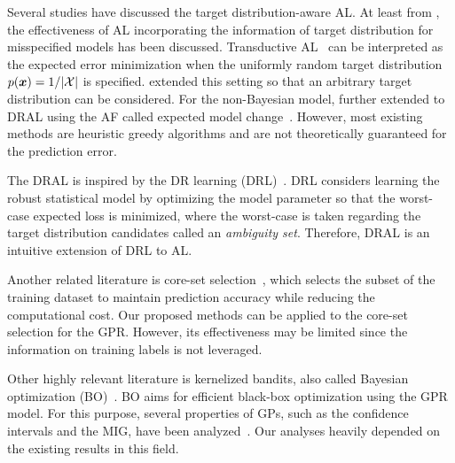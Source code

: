 Several studies have discussed the target distribution-aware AL.
%
At least from \citet{sugiyama2005active}, the effectiveness of AL incorporating the information of target distribution for misspecified models has been discussed.
%
Transductive AL~\citep{Seo2000gaussian,yu2006active,Shoham2023experimental} can be interpreted as the expected error minimization when the uniformly random target distribution $p(\boldsymbol{x}) = 1 / |{\cal X}|$ is specified.
%
\citet{kirsch2021test,kirsch2022unifying,bickford2023-prediction} extended this setting so that an arbitrary target distribution can be considered.
%
For the non-Bayesian model, \citet{frogner2021incorporating} further extended to DRAL using the AF called expected model change~\citep{settles2009-active}.
%
However, most existing methods are heuristic greedy algorithms and are not theoretically guaranteed for the prediction error.


The DRAL is inspired by the DR learning (DRL)~\citep{chen2018robust,chen2020distributionally}.
%
DRL considers learning the robust statistical model by optimizing the model parameter so that the worst-case expected loss is minimized, where the worst-case is taken regarding the target distribution candidates called an \emph{ambiguity set}.
%
Therefore, DRAL is an intuitive extension of DRL to AL.


Another related literature is core-set selection~\citep{sener2018active}, which selects the subset of the training dataset to maintain prediction accuracy while reducing the computational cost.
%
Our proposed methods can be applied to the core-set selection for the GPR.
%
However, its effectiveness may be limited since the information on training labels is not leveraged.





Other highly relevant literature is kernelized bandits, also called Bayesian optimization (BO)~\citep{Kushner1964-new,Srinivas2010-Gaussian,Shahriari2016-Taking}.
%
BO aims for efficient black-box optimization using the GPR model.
%
For this purpose, several properties of GPs, such as the confidence intervals and the MIG, have been analyzed~\citep{Srinivas2010-Gaussian,vakili2021-optimal,vakili2021-information}.
%
Our analyses heavily depended on the existing results in this field.



